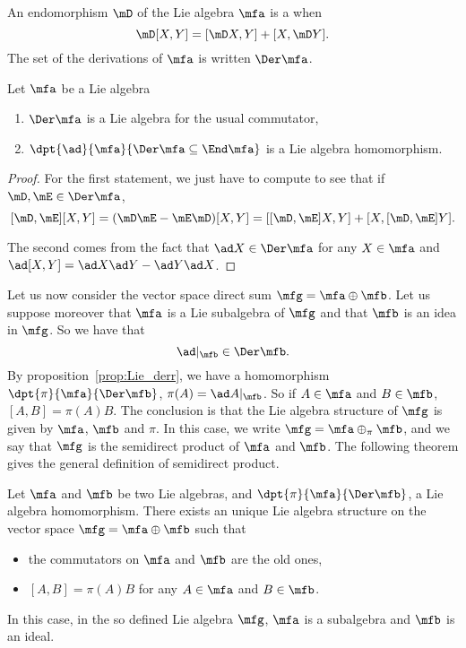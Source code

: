 An endomorphism $\mD$ of the Lie algebra $\mfa$ is a  when
\[
	\mD[X,Y]=[\mD X,Y]+[X,\mD Y].
\]
The set of the derivations of $\mfa$ is written $\Der\mfa$.

\begin{proposition}\label{prop:Lie_derr}
	Let $\mfa$ be a Lie algebra
	\begin{enumerate}
		\item $\Der\mfa$ is a Lie algebra for the usual commutator,
		\item $\dpt{\ad}{\mfa}{\Der\mfa\subseteq\End\mfa}$ is a Lie algebra homomorphism.
	\end{enumerate}
\end{proposition}

\begin{proof}
	For the first statement, we just have to compute to see that if $\mD,\mE\in\Der\mfa$,
	\[
		[\mD,\mE][X,Y]=(\mD\mE-\mE\mD)[X,Y]=[ [\mD,\mE]X,Y ]+[ X,[\mD,\mE]Y ].
	\]

	The second comes from the fact that $\ad X\in\Der\mfa$ for any $X\in\mfa$ and
	$\ad[X,Y]=\ad X\ad Y-\ad Y\ad X$.
\end{proof}

Let us now consider the vector space direct sum $\mfg=\mfa\oplus\mfb$. Let us suppose moreover that $\mfa$ is a Lie subalgebra of $\mfg$ and that $\mfb$ is an idea in $\mfg$. So we have that
\[
	\ad|_{\mfb}\in\Der\mfb.
\]
By proposition~\ref{prop:Lie_derr}, we have a homomorphism $\dpt{\pi}{\mfa}{\Der\mfb}$, $\pi(A)=\ad A|_{\mfb}$. So if $A\in\mfa$ and $B\in\mfb$, $[A,B]=\pi(A)B$. The conclusion is that the Lie algebra structure of $\mfg$ is given by $\mfa$, $\mfb$ and $\pi$. In this case, we write   $\mfg=\mfa\oplus_{\pi}\mfb$,
and we say that $\mfg$ is the semidirect product of $\mfa$ and $\mfb$. The following theorem gives the general definition of semidirect product.

\begin{theorem}
	Let $\mfa$ and $\mfb$ be two Lie algebras, and $\dpt{\pi}{\mfa}{\Der\mfb}$, a Lie algebra homomorphism. There exists an unique Lie algebra structure on the vector space $\mfg=\mfa\oplus\mfb$ such that
	\begin{itemize}
		\item the commutators on $\mfa$ and $\mfb$ are the old ones,
		\item $[A,B]=\pi(A)B$ for any $A\in\mfa$ and $B\in\mfb$.
	\end{itemize}
	In this case, in the so defined Lie algebra $\mfg$, $\mfa$ is a subalgebra and $\mfb$ is an ideal.
\end{theorem}

